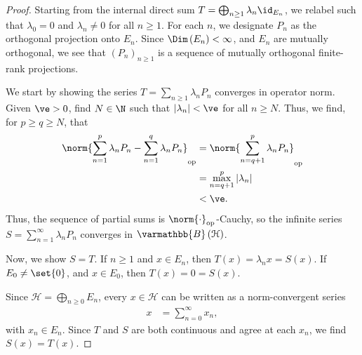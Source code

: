 \documentclass[10pt]{mypackage}
\renewcommand*{\mathbb}[1]{\varmathbb{#1}}
\newcommand{\B}{\mathbb{B}}
\begin{document}
\begin{proof}
  Starting from the internal direct sum $T = \bigoplus_{n\geq 1}\lambda_n\id_{E_n}$, we relabel such that $\lambda_0 = 0$ and $\lambda_n \neq 0$ for all $n\geq 1$. For each $n$, we designate $P_n$ as the orthogonal projection onto $E_n$. Since $\Dim\left(E_n\right) < \infty$, and $E_n$ are mutually orthogonal, we see that $\left(P_n\right)_{n\geq 1}$ is a sequence of mutually orthogonal finite-rank projections.\newline

  We start by showing the series $T = \sum_{n \geq 1}\lambda_nP_n$ converges in operator norm. Given $\ve > 0$, find $N\in \N$ such that $\left\vert \lambda_n \right\vert < \ve$ for all $n\geq N$. Thus, we find, for $p\geq q \geq N$, that
  \begin{align*}
    \norm{\sum_{n=1}^{p}\lambda_nP_n - \sum_{n=1}^{q}\lambda_nP_n}_{\text{op}} &= \norm{\sum_{n=q+1}^{p}\lambda_nP_n}_{\text{op}}\\
                                                                               &= \max_{n=q+1}^{p}\left\vert \lambda_n \right\vert\\
                                                                               & < \ve.
  \end{align*}
  Thus, the sequence of partial sums is $\norm{\cdot}_{\text{op}}$-Cauchy, so the infinite series $S = \sum_{n=1}^{\infty}\lambda_nP_n$ converges in $\B\left(\mathcal{H}\right)$.\newline

  Now, we show $S = T$. If $n\geq 1$ and $x\in E_n$, then $T\left(x\right) = \lambda_n x = S\left(x\right)$. If $E_0 \neq \set{0}$, and $x\in E_0$, then $T\left(x\right) = 0 = S\left(x\right)$.\newline

  Since $\mathcal{H} = \bigoplus_{n\geq 0}E_n$, every $x\in \mathcal{H}$ can be written as a norm-convergent series
  \begin{align*}
    x &= \sum_{n=0}^{\infty}x_n,
  \end{align*}
  with $x_n\in E_n$. Since $T$ and $S$ are both continuous and agree at each $x_n$, we find $S(x) = T(x)$.\newline


\end{proof}
\end{document}
